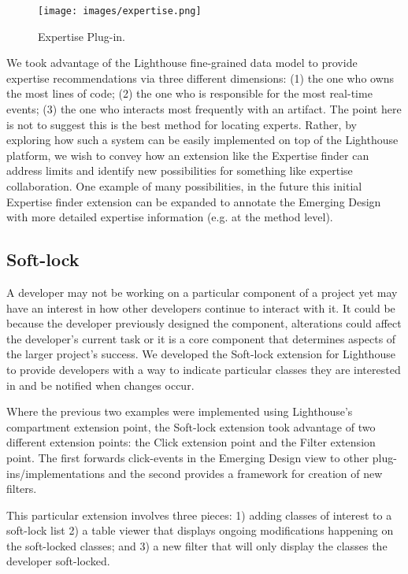 \documentclass[10pt, conference, compsocconf]{IEEEtran}
\begin{document}
\begin{figure}[!t]
	\centering
		\texttt{[image: images/expertise.png]}
	\caption{Expertise Plug-in.}
	\label{fig:expertise}
\end{figure}

We took advantage of the Lighthouse fine-grained data model to provide expertise recommendations via three different dimensions: (1) the one who owns the most lines of code; (2) the one who is responsible for the most real-time events; (3) the one who interacts most frequently with an artifact.   The point here is not to suggest this is the best method for locating experts. Rather, by exploring how such a system can be easily implemented on top of the Lighthouse platform, we wish to convey how an extension like the Expertise finder can address limits and identify new possibilities for something like expertise collaboration.  One example of many possibilities, in the future this initial Expertise finder extension can be expanded to annotate the Emerging Design with more detailed expertise information (e.g. at the method level).

\subsection{Soft-lock}

A developer may not be working on a particular component of a project yet may have an interest in how other developers continue to interact with it.  It could be because the developer previously designed the component, alterations could affect the developer's current task or it is a core component that determines aspects of the larger project's success.  We developed the Soft-lock extension for Lighthouse to provide developers with a way to indicate particular classes they are interested in and be notified when changes occur.   

Where the previous two examples were implemented using Lighthouse's compartment extension point, the Soft-lock extension took advantage of two different extension points: the Click extension point and the Filter extension point.  The first forwards click-events in the Emerging Design view to other plug-ins/implementations and the second provides a framework for creation of new filters.

This particular extension involves three pieces: 1) adding classes of interest to a soft-lock list 2) a table viewer that displays ongoing modifications happening on the soft-locked classes; and 3) a new filter that will only display the classes the developer soft-locked.
\end{document}
